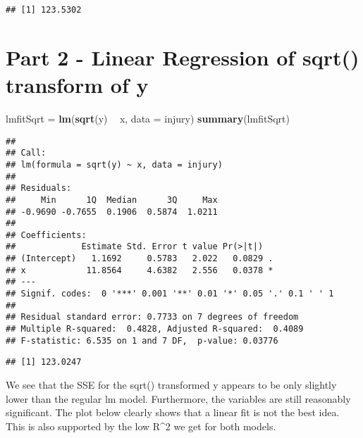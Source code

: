 \documentclass[]{article}
\newenvironment{Shaded}{\begin{snugshade}}{\end{snugshade}}
\newcommand{\DataTypeTok}[1]{\textcolor[rgb]{0.13,0.29,0.53}{#1}}
\newcommand{\DecValTok}[1]{\textcolor[rgb]{0.00,0.00,0.81}{#1}}
\newcommand{\KeywordTok}[1]{\textcolor[rgb]{0.13,0.29,0.53}{\textbf{#1}}}
\newcommand{\NormalTok}[1]{#1}
\newcommand{\OperatorTok}[1]{\textcolor[rgb]{0.81,0.36,0.00}{\textbf{#1}}}
\newcommand{\StringTok}[1]{\textcolor[rgb]{0.31,0.60,0.02}{#1}}
\begin{document}
\begin{verbatim}
## [1] 123.5302
\end{verbatim}

\hypertarget{part-2---linear-regression-of-sqrt-transform-of-y}{%
\section{Part 2 - Linear Regression of sqrt() transform of
y}\label{part-2---linear-regression-of-sqrt-transform-of-y}}

\begin{Shaded}
\begin{Highlighting}[]
\NormalTok{lmfitSqrt =}\StringTok{ }\KeywordTok{lm}\NormalTok{(}\KeywordTok{sqrt}\NormalTok{(y) }\OperatorTok{~}\StringTok{ }\NormalTok{x, }\DataTypeTok{data =}\NormalTok{ injury)}
\KeywordTok{summary}\NormalTok{(lmfitSqrt)}
\end{Highlighting}
\end{Shaded}

\begin{verbatim}
## 
## Call:
## lm(formula = sqrt(y) ~ x, data = injury)
## 
## Residuals:
##     Min      1Q  Median      3Q     Max 
## -0.9690 -0.7655  0.1906  0.5874  1.0211 
## 
## Coefficients:
##             Estimate Std. Error t value Pr(>|t|)  
## (Intercept)   1.1692     0.5783   2.022   0.0829 .
## x            11.8564     4.6382   2.556   0.0378 *
## ---
## Signif. codes:  0 '***' 0.001 '**' 0.01 '*' 0.05 '.' 0.1 ' ' 1
## 
## Residual standard error: 0.7733 on 7 degrees of freedom
## Multiple R-squared:  0.4828, Adjusted R-squared:  0.4089 
## F-statistic: 6.535 on 1 and 7 DF,  p-value: 0.03776
\end{verbatim}

\begin{Shaded}
\end{Shaded}

\begin{verbatim}
## [1] 123.0247
\end{verbatim}

We see that the SSE for the sqrt() transformed y appears to be only
slightly lower than the regular lm model. Furthermore, the variables are
still reasonably significant. The plot below clearly shows that a linear
fit is not the best idea. This is also supported by the low R\^{}2 we
get for both models.
\end{document}
